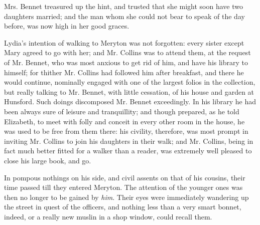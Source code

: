 Mrs. Bennet treasured up the hint, and trusted that she might soon have two daughters married; and the man whom she could not bear to speak of the day before, was now high in her good graces.

Lydia's intention of walking to Meryton was not forgotten: every sister except Mary agreed to go with her; and Mr. Collins was to attend them, at the request of Mr. Bennet, who was most anxious to get rid of him, and have his library to himself; for thither Mr. Collins had followed him after breakfast, and there he would continue, nominally engaged with one of the largest folios in the collection, but really talking to Mr. Bennet, with little cessation, of his house and garden at Hunsford. Such doings discomposed Mr. Bennet exceedingly. In his library he had been always sure of leisure and tranquillity; and though prepared, as he told Elizabeth, to meet with folly and conceit in every other room in the house, he was used to be free from them there: his civility, therefore, was most prompt in inviting Mr. Collins to join his daughters in their walk; and Mr. Collins, being in fact much better fitted for a walker than a reader, was extremely well pleased to close his large book, and go.

In pompous nothings on his side, and civil assents on that of his cousins, their time passed till they entered Meryton. The attention of the younger ones was then no longer to be gained by \textit{him}. Their eyes were immediately wandering up the street in quest of the officers, and nothing less than a very smart bonnet, indeed, or a really new muslin in a shop window, could recall them.

